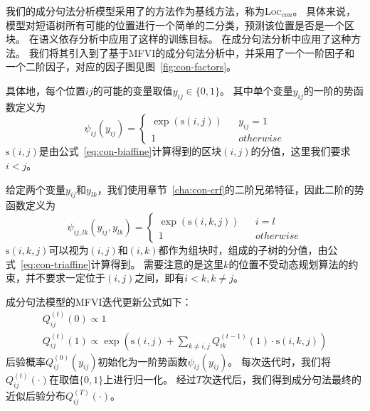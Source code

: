我们的成分句法分析模型采用了\citet{gaddy-etal-2018-whats}的方法作为基线方法，称为\textsc{Loc}$_{con}$。
具体来说，模型对短语树所有可能的位置进行一个简单的二分类，预测该位置是否是一个区块。
\citet{dozat-manning-2018-simpler,wang-etal-2019-second}在语义依存分析中应用了这样的训练目标。
\citet{gormley-eisner-2015-structured,naradowsky-etal-2012-grammarless}在成分句法分析中应用了这种方法。
我们将其引入到了基于MFVI的成分句法分析中，并采用了一个一阶因子和一个二阶因子，对应的因子图见图~\ref{fig:con-factors}。

具体地，每个位置$ij$的可能的变量取值$y_{ij}\in \{0,1\}$。
其中单个变量$y_{ij}$的一阶的势函数定义为
\begin{equation}
	\label{eq:con-1o-potential}
	\psi_{ij}(y_{ij})=\left\{
	\begin{array}{rcl}
		\exp\left(\mathrm{s}(i,j)\right) &   & {y_{ij}=1}  \\
		1                                &   & {otherwise} 
	\end{array}
	\right.
\end{equation}
$\mathrm{s}(i,j)$是由公式~\ref{eq:con-biaffine}计算得到的区块$(i,j)$的分值，这里我们要求$i<j$。

给定两个变量$y_{ij}$和$y_{lk}$，我们使用章节~\ref{cha:con-crf}的二阶兄弟特征，因此二阶的势函数定义为
\begin{equation}
	\label{eq:2o-con-potential}
	\psi_{ij,lk}(y_{ij},y_{lk})=\left\{
	\begin{array}{rcl}
		\exp\left(\mathrm{s}(i,k,j)\right) &   & {i=l}       \\
		1                                  &   & {otherwise} 
	\end{array}
	\right.
\end{equation}
$\mathrm{s}(i,k,j)$可以视为$(i,j)$和$(i,k)$都作为组块时，组成的子树的分值，由公式~\ref{eq:con-triaffine}计算得到。
需要注意的是这里$k$的位置不受动态规划算法的约束，并不要求一定位于$(i,j)$之间，即有$i<k,k\neq j$。

成分句法模型的MFVI迭代更新公式如下：
\begin{equation}
	\label{eq:mfvi-con}
	\begin{array}{l}
		Q_{ij}^{(t)}(0)\propto 1                                                                                            \\
		Q_{ij}^{(t)}(1)\propto \exp\left(\mathrm{s}(i,j) +\sum_{k\neq i,j} Q_{ik}^{(t-1)}(1)\cdot \mathrm{s}(i,k,j) \right) 
	\end{array}
\end{equation}
后验概率$Q_{ij}^{(0)}(y_{ij})$初始化为一阶势函数$\psi_{ij}(y_{ij})$。
每次迭代时，我们将$Q_{ij}^{(t)}(\cdot)$在取值$\{0,1\}$上进行归一化。
经过$T$次迭代后，我们得到成分句法最终的近似后验分布$Q_{ij}^{(T)}(\cdot)$。

